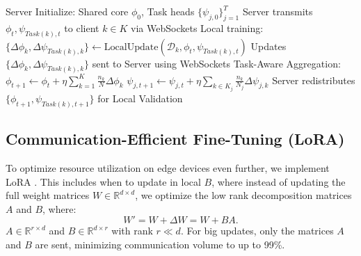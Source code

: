 \begin{algorithm}
\caption{RT-FedMTL: Real-Time Federated Multi-Task Learning}
\label{alg:rt_fedmtl}
\begin{algorithmic}[1]
\STATE Server Initialize: Shared core $\phi_0$, Task heads $\{\psi_{j,0}\}_{j=1}^T$
    \STATE Server transmits $\phi_t, \psi_{Task(k),t}$ to client $k \in K$ via WebSockets
        \STATE Local training: $\{\Delta\phi_k, \Delta\psi_{Task(k),k}\} \leftarrow \text{LocalUpdate}(\mathcal{D}_k, \phi_t, \psi_{Task(k),t})$
        \STATE Updates $\{\Delta\phi_k, \Delta\psi_{Task(k),k}\}$ sent to Server using WebSockets
    \ENDFOR
    \STATE Task-Aware Aggregation:
    \STATE \quad $\phi_{t+1} \leftarrow \phi_t + \eta \sum_{k=1}^K \frac{n_k}{N} \Delta\phi_k$ 
        \STATE $\psi_{j,t+1} \leftarrow \psi_{j,t} + \eta \sum_{k \in K_j} \frac{n_k}{N_j} \Delta\psi_{j,k}$ 
    \ENDFOR
    \STATE Server redistributes $\{\phi_{t+1}, \psi_{Task(k),t+1}\}$ for Local Validation
\ENDFOR
\end{algorithmic}
\end{algorithm}

\subsection{Communication-Efficient Fine-Tuning (LoRA)}
To optimize resource utilization on edge devices even further, we implement LoRA \cite{hu2021lora}. This includes when to update in local $B$, where instead of updating the full weight matrices $W \in \mathbb{R}^{d \times d}$, we optimize the low rank decomposition matrices $A$ and $B$, where:
\begin{equation}
W' = W + \Delta W = W + BA.
\end{equation}
$A \in \mathbb{R}^{r \times d}$ and $B \in \mathbb{R}^{d \times r}$ with rank $r \ll d$. For big updates, only the matrices $A$ and $B$ are sent, minimizing communication volume to up to 99\%.